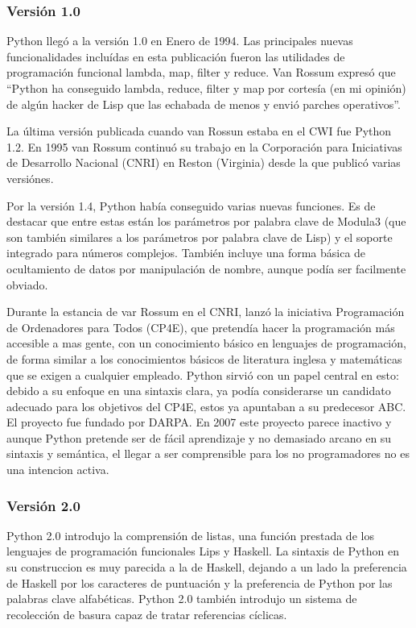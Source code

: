 \documentclass[a4paper,spanish,12pt]{book}
\begin{document}
\subsubsection{Versión 1.0}

Python llegó a la versión 1.0 en Enero de 1994. Las principales nuevas funcionalidades incluídas en esta publicación fueron las utilidades de programación funcional lambda, map, filter y reduce. Van Rossum expresó que ``Python ha conseguido lambda, reduce, filter y map por cortesía (en mi opinión) de algún hacker de Lisp que las echabada de menos y envió parches operativos''.

La última versión publicada cuando van Rossun estaba en el CWI fue Python 1.2. En 1995 van Rossum continuó su trabajo en la Corporación para Iniciativas de Desarrollo Nacional (CNRI) en Reston (Virginia) desde la que publicó varias versiónes.

Por la versión 1.4, Python había conseguido varias nuevas funciones. Es de destacar que entre estas están los parámetros por palabra clave de Modula3 (que son tambi\'en similares a los parámetros por palabra clave de Lisp) y el soporte integrado para números complejos. Tambi\'en incluye una forma básica de ocultamiento de datos por manipulación de nombre, aunque podía ser facilmente obviado.

Durante la estancia de var Rossum en el CNRI, lanzó la iniciativa Programación de Ordenadores para Todos (CP4E), que pretendía hacer la programación más accesible a mas gente, con un conocimiento básico en lenguajes de programación, de forma similar a los conocimientos básicos de literatura inglesa y matemáticas que se exigen a cualquier empleado. Python sirvió con un papel central en esto: debido a su enfoque en una sintaxis clara, ya podía considerarse un candidato adecuado para los objetivos del CP4E, estos ya apuntaban a su predecesor ABC. El proyecto fue fundado por DARPA. En 2007 este proyecto parece inactivo y aunque Python pretende ser de fácil aprendizaje y no demasiado arcano en su sintaxis y semántica, el llegar a ser comprensible para los no programadores no es una intencion activa.

\subsubsection{Versión 2.0}

Python 2.0 introdujo la comprensión de listas, una función prestada de los lenguajes de programación funcionales Lips y Haskell. La sintaxis de Python en su construccion es muy parecida a la de Haskell, dejando a un lado la preferencia de Haskell por los caracteres de puntuación y la preferencia de Python por las palabras clave alfabéticas. Python 2.0 tambi\'en introdujo un sistema de recolección de basura capaz de tratar referencias cíclicas.
\end{document}
